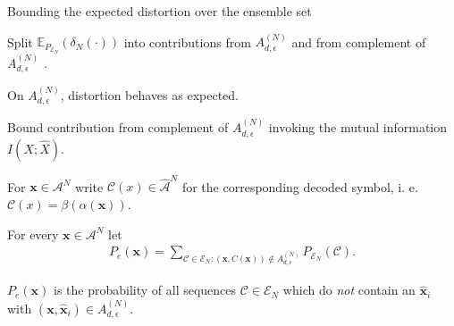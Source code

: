 \begin{frame}{Bounding the expected distortion over the ensemble set}
\bit
\item Split $\mathbb{E}_{P_{\mathcal{E}_N}}(\delta_N(\cdot))$ into contributions from $A_{d,\epsilon}^{(N)}$ and from complement of $A_{d,\epsilon}^{(N)}$ . 
\item On $A_{d,\epsilon}^{(N)}$, distortion behaves as expected. 
\item Bound contribution from complement of $A_{d,\epsilon}^{(N)}$ invoking the mutual information $I(X;\hat{X})$. 
\eit 

\bit
\item For $\mathbf{x}\in\mathcal{A}^N$ write $\mathcal{C}(x)\in\widehat{\mathcal{A}}^N$ for the corresponding decoded symbol, i. e. 
$\mathcal{C}(x)=\beta(\alpha(\mathbf{x}))$.  
\item For every $\mathbf{x}\in\mathcal{A}^N$ let 
\begin{align*}
P_e(\mathbf{x})=\sum_{\mathcal{C}\in\mathcal{E}_N\colon (\mathbf{x},C(\mathbf{x}))\notin A_{d,\epsilon}^{(N)}}P_{\mathcal{E}_N}(\mathcal{C}).
\end{align*}
\item $P_e(\mathbf{x})$ is the probability of all sequences $\mathcal{C}\in\mathcal{E}_N$ which do \textit{not} contain 
an ${\hat{\mathbf{x}}}_i$ with $(\mathbf{x},{\hat{\mathbf{x}}}_i)\in A_{d, \epsilon}^{(N)}$.
\eit

\end{frame}



